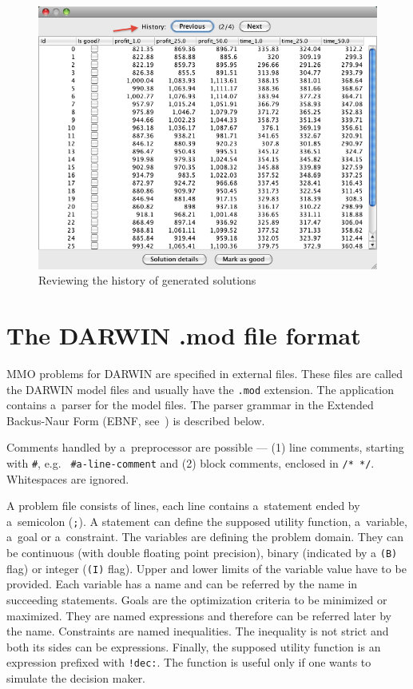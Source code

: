 \begin{figure}
  \centering
  \includegraphics[scale=0.7]{img/manual/10_history}
  \caption{Reviewing the history of generated solutions}
  \label{manual_10_history}
\end{figure}

\clearpage{}
\chapter{The DARWIN .mod file format}

MMO problems for DARWIN are specified in external files. These files are
called the DARWIN model files and usually have the \texttt{.mod}
extension. The application contains a~parser for the model files. The parser
grammar in the Extended Backus-Naur Form (EBNF, see~\cite{Wir77}) is described
below.



Comments handled by a~preprocessor are possible --- (1) line comments,
starting with \texttt{\#}, e.g. \texttt{ \#a-line-comment} and (2) block
comments, enclosed in \texttt{/* */}. Whitespaces are ignored.

A problem file consists of lines, each line contains a~statement ended by
a~semicolon (\texttt{;}). A statement can define the supposed utility
function, a~variable, a~goal or a~constraint. The variables are defining the
problem domain. They can be continuous (with double floating point precision),
binary (indicated by a \texttt{(B)} flag) or integer (\texttt{(I)} flag).
Upper and lower limits of the variable value have to be provided. Each
variable has a name and can be referred by the name in succeeding
statements. Goals are the optimization criteria to be minimized or
maximized. They are named expressions and therefore can be referred later by
the name. Constraints are named inequalities. The inequality is not strict and
both its sides can be expressions. Finally, the supposed utility function is
an expression prefixed with \texttt{!dec:}. The function is useful only if one
wants to simulate the decision maker.


